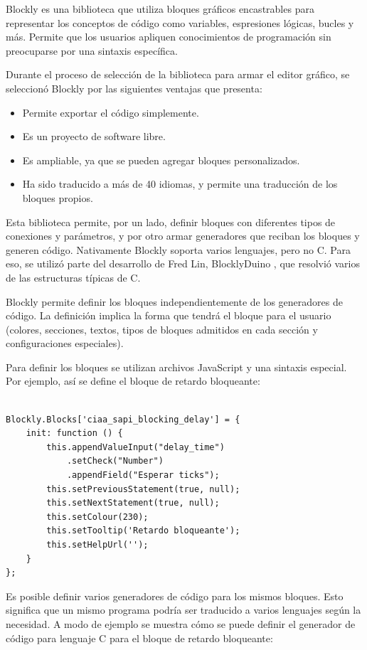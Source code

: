 Blockly es una biblioteca que utiliza bloques gráficos encastrables para representar los conceptos de código como variables, espresiones lógicas, bucles y más. Permite que los usuarios apliquen conocimientos de programación sin preocuparse por una sintaxis específica.

Durante el proceso de selección de la biblioteca para armar el editor gráfico, se seleccionó Blockly por las siguientes ventajas que presenta:

\begin{itemize}
\item Permite exportar el código simplemente.
\item Es un proyecto de software libre.
\item Es ampliable, ya que se pueden agregar bloques personalizados.
\item Ha sido traducido a más de 40 idiomas, y permite una traducción de los bloques propios.
\end{itemize}

Esta biblioteca permite, por un lado, definir bloques con diferentes tipos de conexiones y parámetros, y por otro armar generadores que reciban los bloques y generen código. Nativamente Blockly soporta varios lenguajes, pero no C. Para eso, se utilizó parte del desarrollo de Fred Lin, BlocklyDuino \citep{blocklyduino}, que resolvió varios de las estructuras típicas de C.

Blockly permite definir los bloques independientemente de los generadores de código. La definición implica la forma que tendrá el bloque para el usuario (colores, secciones, textos, tipos de bloques admitidos en cada sección y configuraciones especiales).

Para definir los bloques se utilizan archivos JavaScript y una sintaxis especial. Por ejemplo, así se define el bloque de retardo bloqueante:


\begin{lstlisting}[caption=Definición del bloque de retardo bloqueante.]

Blockly.Blocks['ciaa_sapi_blocking_delay'] = {
    init: function () {
        this.appendValueInput("delay_time")
            .setCheck("Number")
            .appendField("Esperar ticks");
        this.setPreviousStatement(true, null);
        this.setNextStatement(true, null);
        this.setColour(230);
        this.setTooltip('Retardo bloqueante');
        this.setHelpUrl('');
    }
};
\end{lstlisting}

Es posible definir varios generadores de código para los mismos bloques. Esto significa que un mismo programa podría ser traducido a varios lenguajes según la necesidad. A modo de ejemplo se muestra cómo se puede definir el generador de código para lenguaje C para el bloque de retardo bloqueante:

